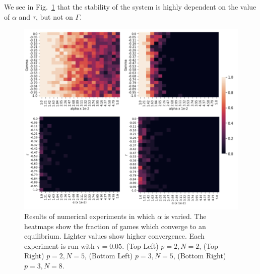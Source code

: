 \documentclass{article}
\begin{document}
We see in Fig.~\ref{fig:NumericalExperiments} that the stability of the system is highly dependent on
the value of $\alpha$ and $\tau$, but not on $\Gamma$.
  \begin{center}
      \begin{figure}[t]
            \includegraphics[width = 1.2 \linewidth, center]{Figures/Experiments.png}
            \caption{Results of numerical experiments in which $\alpha$ is varied. The heatmaps show the fraction of games which converge to an equilibrium. Lighter values show higher convergence. Each experiment is run with $\tau = 0.05$. (Top Left) $p = 2, N = 2$, (Top Right) $p = 2, N = 5$, (Bottom Left) $p = 3, N = 5$, (Bottom Right) $p=3, N = 8$.}
            \label{fig:NumericalExperiments}
        \end{figure}
  \end{center}


\end{document}
